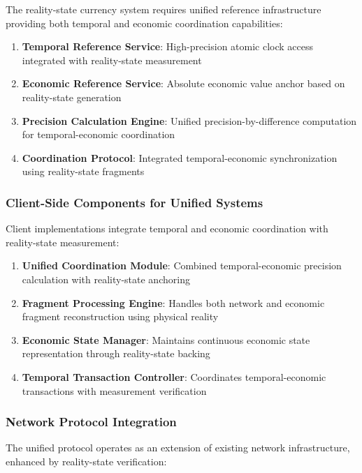 \documentclass[12pt,a4paper]{article}
\begin{document}
The reality-state currency system requires unified reference infrastructure providing both temporal and economic coordination capabilities:

\begin{enumerate}
\item \textbf{Temporal Reference Service}: High-precision atomic clock access integrated with reality-state measurement
\item \textbf{Economic Reference Service}: Absolute economic value anchor based on reality-state generation
\item \textbf{Precision Calculation Engine}: Unified precision-by-difference computation for temporal-economic coordination
\item \textbf{Coordination Protocol}: Integrated temporal-economic synchronization using reality-state fragments
\end{enumerate}

\subsubsection{Client-Side Components for Unified Systems}

Client implementations integrate temporal and economic coordination with reality-state measurement:

\begin{enumerate}
\item \textbf{Unified Coordination Module}: Combined temporal-economic precision calculation with reality-state anchoring
\item \textbf{Fragment Processing Engine}: Handles both network and economic fragment reconstruction using physical reality
\item \textbf{Economic State Manager}: Maintains continuous economic state representation through reality-state backing
\item \textbf{Temporal Transaction Controller}: Coordinates temporal-economic transactions with measurement verification
\end{enumerate}

\subsubsection{Network Protocol Integration}

The unified protocol operates as an extension of existing network infrastructure, enhanced by reality-state verification:
\end{document}

